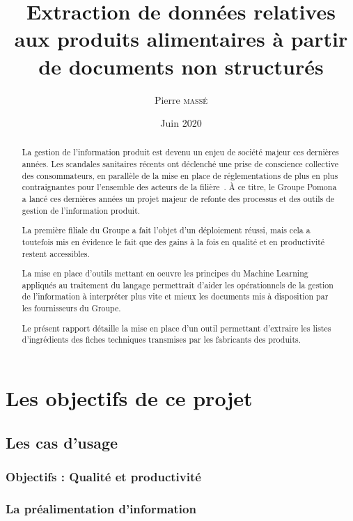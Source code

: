 \documentclass{report}
\title{Extraction de données relatives aux produits alimentaires à partir de documents non structurés}
\author{Pierre \textsc{massé}}
\date{Juin 2020}
\begin{document}
\maketitle

\large
\begin{abstract}   
    
    La gestion de l'information produit est devenu un enjeu de société majeur ces dernières années.
    Les scandales sanitaires récents ont déclenché une prise de conscience collective des consommateurs, en parallèle de la mise en place de réglementations de plus en plus contraignantes pour l'ensemble des acteurs de la filière~\cite{incotext}\cite{incoexpl}.
    \`{A} ce titre, le Groupe Pomona a lancé ces dernières années un projet majeur de refonte des processus et des outils de gestion de l'information produit.

    La première filiale du Groupe a fait l'objet d'un déploiement réussi, mais cela a toutefois mis en évidence le fait que des gains à la fois en qualité et en productivité restent accessibles.

    La mise en place d'outils mettant en oeuvre les principes du Machine Learning appliqués au traitement du langage permettrait d'aider les opérationnels de la gestion de l'information à interpréter plus vite et mieux les documents mis à disposition par les fournisseurs du Groupe.

    Le présent rapport détaille la mise en place d'un outil permettant d'extraire les listes d'ingrédients des fiches techniques transmises par les fabricants des produits.
\end{abstract}
\normalsize

\tableofcontents





\part{Les objectifs de ce projet}
    \chapter{Les cas d'usage}
        \section{Objectifs : Qualité et productivité}
        \section{La préalimentation d'information}
\end{document}
